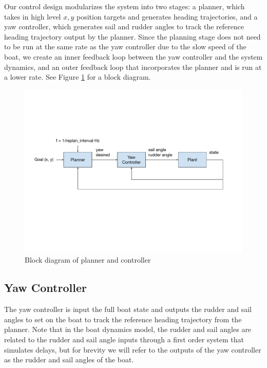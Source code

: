 \documentclass[conference]{IEEEtran}
\begin{document}
Our control design modularizes the system into two stages: a planner, which takes in high level \(x,y\) position 
targets and generates heading trajectories, and a yaw controller, which generates sail and rudder angles 
to track the reference heading trajectory output by the planner. Since the planning stage does not need 
to be run at the same rate as the yaw controller due to the slow speed of the boat, we create an inner feedback loop between the yaw controller and the system dynamics, and an outer feedback loop that incorporates the planner and is run at a lower rate. See Figure \ref{fig:controller_block_diagram} for a block diagram.

\begin{figure}
    \centering
    \includegraphics[trim={1.1cm 7cm 2cm 5cm},clip]{documents/final_pres_figs/controller_block_diagram.pdf}
    \caption{Block diagram of planner and controller}
    \label{fig:controller_block_diagram}
\end{figure}

\subsection{Yaw Controller}

The yaw controller is input the full boat state and outputs the rudder and sail angles to set on the boat to track the reference heading trajectory from the planner. Note that in the boat dynamics model, the rudder and sail angles are related to the rudder and sail angle inputs through a first order system that simulates delays, but for brevity we will refer to the outputs of the yaw controller as the rudder and sail angles of the boat.
\end{document}
